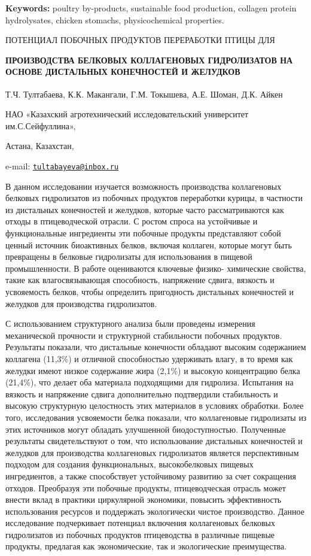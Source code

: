 {\bfseries Keywords:} poultry by-products, sustainable food production,
collagen protein hydrolysates, chicken stomachs, physicochemical
properties.

ПОТЕНЦИАЛ ПОБОЧНЫХ ПРОДУКТОВ ПЕРЕРАБОТКИ ПТИЦЫ ДЛЯ

\begin{articleheader}
{\bfseries ПРОИЗВОДСТВА БЕЛКОВЫХ КОЛЛАГЕНОВЫХ ГИДРОЛИЗАТОВ НА ОСНОВЕ
ДИСТАЛЬНЫХ КОНЕЧНОСТЕЙ И ЖЕЛУДКОВ}

Т.Ч. Тултабаева\textsuperscript{\envelope }, К.К. Макангали, Г.М. Токышева, А.Е.
Шоман, Д.К. Айкен
\end{articleheader}

\begin{affiliation}
НАО «Казахский агротехнический исследовательский университет
им.С.Сейфуллина»,

Астана, Казахстан,

e-mail: \href{mailto:tultabayeva@inbox.ru}{\nolinkurl{tultabayeva@inbox.ru}}
\end{affiliation}

В данном исследовании изучается возможность производства коллагеновых
белковых гидролизатов из побочных продуктов переработки курицы, в
частности из дистальных конечностей и желудков, которые часто
рассматриваются как отходы в птицеводческой отрасли. С ростом спроса на
устойчивые и функциональные ингредиенты эти побочные продукты
представляют собой ценный источник биоактивных белков, включая коллаген,
которые могут быть превращены в белковые гидролизаты для использования в
пищевой промышленности. В работе оцениваются ключевые физико- химические
свойства, такие как влагосвязывающая способность, напряжение сдвига,
вязкость и усвояемость белков, чтобы определить пригодность дистальных
конечностей и желудков для производства гидролизатов.

С использованием структурного анализа были проведены измерения
механической прочности и структурной стабильности побочных продуктов.
Результаты показали, что дистальные конечности обладают высоким
содержанием коллагена (11,3\%) и отличной способностью удерживать влагу,
в то время как желудки имеют низкое содержание жира (2,1\%) и высокую
концентрацию белка (21,4\%), что делает оба материала подходящими для
гидролиза. Испытания на вязкость и напряжение сдвига дополнительно
подтвердили стабильность и высокую структурную целостность этих
материалов в условиях обработки. Более того, исследования усвояемости
белка показали, что коллагеновые гидролизаты из этих источников могут
обладать улучшенной биодоступностью. Полученные результаты
свидетельствуют о том, что использование дистальных конечностей и
желудков для производства коллагеновых гидролизатов является
перспективным подходом для создания функциональных, высокобелковых
пищевых ингредиентов, а также способствует устойчивому развитию за счет
сокращения отходов. Преобразуя эти побочные продукты, птицеводческая
отрасль может внести вклад в практики циркулярной экономики, повысить
эффективность использования ресурсов и поддержать экологически чистое
производство. Данное исследование подчеркивает потенциал включения
коллагеновых белковых гидролизатов из побочных продуктов птицеводства в
различные пищевые продукты, предлагая как экономические, так и
экологические преимущества.

